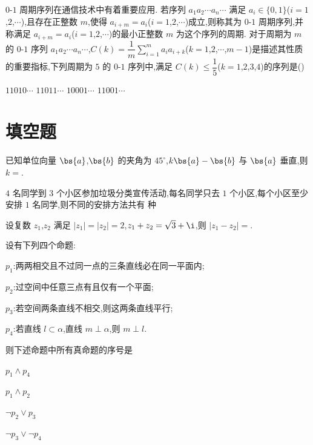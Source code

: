 \begin{problem}
\(0\)-\(1\) 周期序列在通信技术中有着重要应用. 若序列 \(a_1a_2\cdots a_n\cdots\) 满足 \(a_i\in\{0,1\}\)(\(i=1\),\(2\),\(\cdots\)),且存在正整数 \(m\),使得 \(a_{i+m}=a_i\)(\(i=1\),\(2\),\(\cdots\))成立,则称其为 \(0\)-\(1\) 周期序列,并称满足 \(a_{i+m}=a_i\)(\(i=1\),\(2\),\(\cdots\))的最小正整数 \(m\) 为这个序列的周期. 对于周期为 \(m\) 的 \(0\)-\(1\) 序列 \(a_1a_2\cdots a_n\cdots\),\(C(k)=\dfrac{1}{m}\sum_{i=1}^{m} a_i a_{i+k}\)(\(k=1\),\(2\),\(\cdots\),\(m-1\))是描述其性质的重要指标,下列周期为 \(5\) 的 \(0\)-\(1\) 序列中,满足 \(C(k)\leq \dfrac{1}{5}\)(\(k=1\),\(2\),\(3\),\(4\))的序列是(\quad)

\choices
    {\(11010\cdots\)}
    {\(11011\cdots\)}
    {\(10001\cdots\)}
    {\(11001\cdots\)}
\end{problem}

\section{填空题}

\begin{problem}
已知单位向量 \(\bs{a}\),\(\bs{b}\) 的夹角为 \(45^\circ\),\(k\bs{a}-\bs{b}\) 与 \(\bs{a}\) 垂直,则 \(k=\)\fillinblank{}.
\end{problem}

\begin{problem}
\(4\) 名同学到 \(3\) 个小区参加垃圾分类宣传活动,每名同学只去 \(1\) 个小区,每个小区至少安排 \(1\) 名同学,则不同的安排方法共有\fillinblank{} 种
\end{problem}

\begin{problem}
设复数 \(z_1\),\(z_2\) 满足 \(|z_1|=|z_2|=2\),\(z_1+z_2=\sqrt3+\i\),则 \(|z_1-z_2|=\)\fillinblank{}.
\end{problem}

\begin{problem}
设有下列四个命题:

\begin{circlelist}
\item \(p_1\):两两相交且不过同一点的三条直线必在同一平面内;
\item \(p_2\):过空间中任意三点有且仅有一个平面;
\item \(p_3\):若空间两条直线不相交,则这两条直线平行;
\item \(p_4\):若直线 \(l\subset \alpha\),直线 \(m\perp \alpha\),则 \(m\perp l\).
\end{circlelist}

则下述命题中所有真命题的序号是\fillinblank{}

\begin{circlelist}
\item \(p_1\land p_4\)
\item \(p_1\land p_2\)
\item \(\neg p_2\vee p_3\)
\item \(\neg p_3\vee \neg p_4\)
\end{circlelist}
\end{problem}

